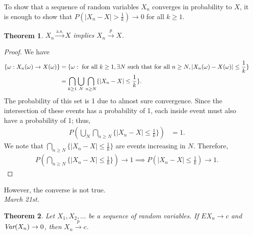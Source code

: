 \documentclass[15pt,a4paper]{book}
\newtheorem{theorem}{Theorem}[chapter]
\theoremstyle{definition}
\newcommand{\abs}[1]{\left| #1 \right|} %
\newcommand{\toup}[1]{\xrightarrow{#1}}
\begin{document}
To show that a sequence of random variables $X_{n}$ converges in probability to $X$, it is enough to show that $P(\abs{X_{n}-X} > \frac{1}{k}) \to 0$ for all $k \geq 1$.

\begin{theorem}
    $X_{n} \toup{\text{a.s.}} X$ implies $X_{n} \toup{p} X$.
\end{theorem}
\begin{proof}
    We have
    \begin{align}
        \{\omega:X_{n}(\omega) \to X(\omega)\} &= \{\omega: \text{ for all } k \geq 1, \exists N \text{ such that for all } n \geq N, \abs{X_{n}(\omega)-X(\omega)} \leq \frac{1}{k}\} \notag\\
        &= \bigcap_{k \geq 1} \bigcup_{N} \bigcap_{n \geq N} \{\abs{X_{n}-X} \leq \frac{1}{k}\}.
    \end{align}
    The probability of this set is 1 due to almost sure convergence. Since the intersection of these events has a probability of 1, each inside event must also have a probability of 1; thus,
    \begin{align}
        P(\bigcup_{N} \bigcap_{n \geq N} \{\abs{X_{n}-X} \leq \frac{1}{k}\}) &= 1.
    \end{align}
    We note that $\bigcap_{n \geq N} \{\abs{X_{n}-X} \leq \frac{1}{k}\}$ are events increasing in $N$. Therefore,
    \begin{align}
        P(\bigcap_{n \geq N} \{\abs{X_{n}-X} \leq \frac{1}{k}\}) \to 1 \implies P(\abs{X_{n}-X} \leq \frac{1}{k}) \to 1.
    \end{align}
\end{proof}
However, the converse is not true.\\
\textit{March 21st.}

\begin{theorem}
    Let $X_{1},X_{2},\ldots$ be a sequence of random variables. If $EX_{n} \to c$ and $\emph{\text{Var}}(X_{n}) \to 0$, then $X_{n} \toup{p}  c$.
\end{theorem}
\end{document}

